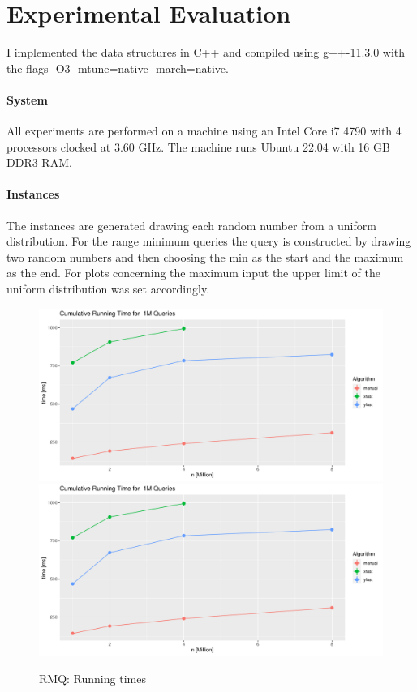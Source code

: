 \documentclass[a4paper,UKenglish,cleveref, autoref, thm-restate]{lipics-v2021}
\begin{document}
\section{Experimental Evaluation}
I implemented the data structures in C++ and compiled using g++-11.3.0 with the flags -O3 -mtune=native -march=native.

\paragraph*{System} All experiments are performed on a machine using an Intel Core i7 4790 with 4 processors clocked at 3.60 GHz. The machine runs Ubuntu 22.04 with 16 GB DDR3 RAM.

\paragraph*{Instances} The instances are generated drawing each random number from a uniform distribution. For the range minimum queries the query is constructed by drawing two random numbers and then choosing the min as the start and the maximum as the end. For plots concerning the maximum input the upper limit of the uniform distribution was set accordingly.

\begin{figure}[!htb]
 \centering
\includegraphics[page=1, width=0.9\linewidth]{../../eval/plots.pdf}
 \endminipage\hfill
 \centering
\includegraphics[page=4, width=0.9\linewidth]{../../eval/plots.pdf}
 \endminipage
 \caption{RMQ: Running times}
  \label{fig:rmq_rt_init}
\end{figure}
 
\end{document}

